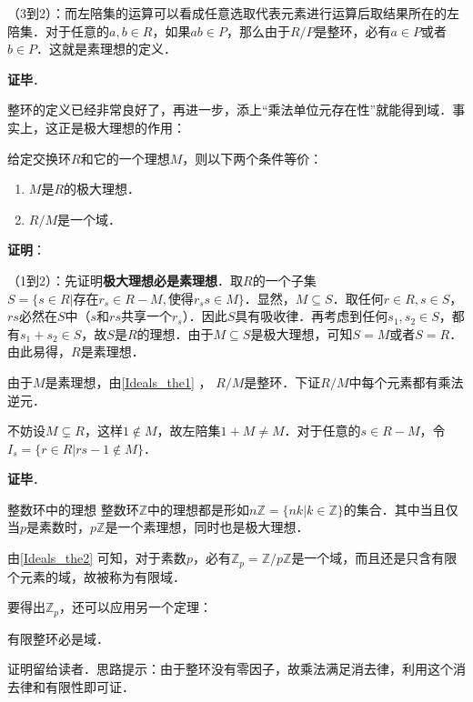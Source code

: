 （3到2）：而左陪集的运算可以看成任意选取代表元素进行运算后取结果所在的左陪集．对于任意的$a, b\in R$，如果$ab\in P$，那么由于$R/P$是整环，必有$a\in P$或者$b\in P$．这就是素理想的定义．

\textbf{证毕}．

整环的定义已经非常良好了，再进一步，添上“乘法单位元存在性”就能得到域．事实上，这正是极大理想的作用：

\begin{theorem}{}\label{Ideals_the2}
给定交换环$R$和它的一个理想$M$，则以下两个条件等价：
\begin{enumerate}
\item $M$是$R$的极大理想．
\item $R/M$是一个域．
\end{enumerate}
\end{theorem}

\textbf{证明}：

（1到2）：先证明\textbf{极大理想必是素理想}．取$R$的一个子集$S=\{s\in R|\text{存在} r_s\in R-M, \text{使得}r_ss\in M\}$．显然，$M\subseteq S$．取任何$r\in R, s\in S$，$rs$必然在$S$中（$s$和$rs$共享一个$r_s$）．因此$S$具有吸收律．再考虑到任何$s_1, s_2\in S$，都有$s_1+s_2\in S$，故$S$是$R$的理想．由于$M\subseteq S$是极大理想，可知$S=M$或者$S=R$．由此易得，$R$是素理想．

由于$M$是素理想，由\autoref{Ideals_the1} ， $R/M$是整环．下证$R/M$中每个元素都有乘法逆元．

不妨设$M\subsetneq R$，这样$1\not\in M$，故左陪集$1+M\not=M$．对于任意的$s\in R-M$，令$I_s=\{r\in R|rs-1\not\in M\}$．

\textbf{证毕}．


\begin{example}{整数环中的理想}
整数环$\mathbb{Z}$中的理想都是形如$n\mathbb{Z}=\{nk|k\in\mathbb{Z}\}$的集合．其中当且仅当$p$是素数时，$p\mathbb{Z}$是一个素理想，同时也是极大理想．

由\autoref{Ideals_the2} 可知，对于素数$p$，必有$\mathbb{Z}_p=\mathbb{Z}/p\mathbb{Z}$是一个域，而且还是只含有限个元素的域，故被称为有限域．
\end{example}

要得出$\mathbb{Z}_p$，还可以应用另一个定理：

\begin{theorem}{}
有限整环必是域．
\end{theorem}

证明留给读者．思路提示：由于整环没有零因子，故乘法满足消去律，利用这个消去律和有限性即可证．



